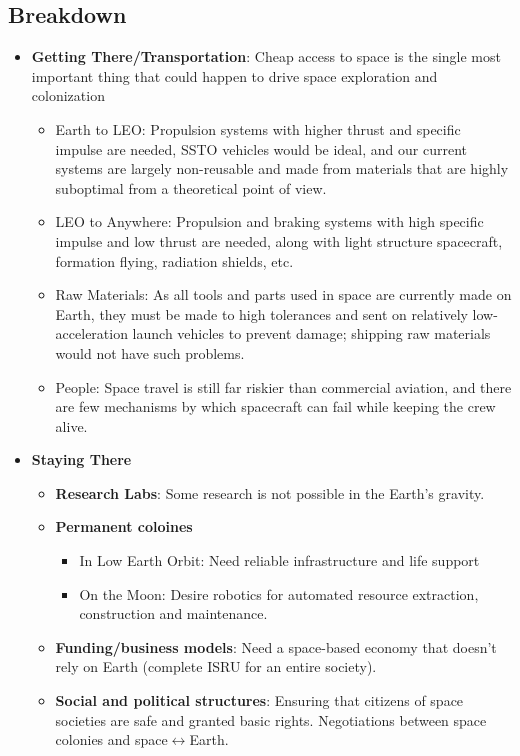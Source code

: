 \documentclass[letter,11pt]{article}
\begin{document}
\subsection{Breakdown}
\begin{itemize}
	\item \textbf{Getting There/Transportation}: Cheap access to space is the single most important thing that could happen to drive space exploration and colonization \begin{itemize}
			\item Earth to \gls{LEO}: Propulsion systems with higher thrust and specific impulse are needed, \gls{SSTO} vehicles would be ideal, and our current systems are largely non-reusable and made from materials that are highly suboptimal from a theoretical point of view.
				\item \gls{LEO} to Anywhere: Propulsion and braking systems with high specific impulse and low thrust are needed, along with light structure spacecraft, formation flying, radiation shields, etc.
				\item Raw Materials: As all tools and parts used in space are currently made on Earth, they must be made to high tolerances and sent on relatively low-acceleration launch vehicles to prevent damage; shipping raw materials would not have such problems.
				\item People: Space travel is still far riskier than commercial aviation, and there are few mechanisms by which spacecraft can fail while keeping the crew alive.
			\end{itemize}
	\item \textbf{Staying There} \begin{itemize}
			\item \textbf{Research Labs}: Some research is not possible in the Earth's gravity.
			\item \textbf{Permanent coloines} \begin{itemize}
					\item In Low Earth Orbit: Need reliable infrastructure and life support
					\item On the Moon: Desire robotics for automated resource extraction, construction and maintenance.
				\end{itemize}
			\item \textbf{Funding/business models}: Need a space-based economy that doesn't rely on Earth (complete ISRU for an entire society).
			\item \textbf{Social and political structures}: Ensuring that citizens of space societies are safe and granted basic rights. Negotiations between space colonies and space$\leftrightarrow$Earth.

\end{itemize}
\end{itemize}
\end{document}
